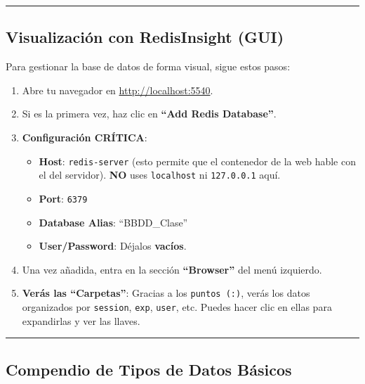 \documentclass[12pt,a4paper]{article}
\providecommand{\tightlist}{%
  \setlength{\itemsep}{0pt}\setlength{\parskip}{0pt}}
\begin{document}
\begin{center}\rule{0.5\linewidth}{0.5pt}\end{center}

\hypertarget{visualizaciuxf3n-con-redisinsight-gui}{%
\subsection{Visualización con RedisInsight
(GUI)}\label{visualizaciuxf3n-con-redisinsight-gui}}

Para gestionar la base de datos de forma visual, sigue estos pasos:

\begin{enumerate}
\def\labelenumi{\arabic{enumi}.}
\tightlist
\item
  Abre tu navegador en \url{http://localhost:5540}.
\item
  Si es la primera vez, haz clic en \textbf{``Add Redis Database''}.
\item
  \textbf{Configuración CRÍTICA}:

  \begin{itemize}
  \tightlist
  \item
    \textbf{Host}: \texttt{redis-server} (esto permite que el
    contenedor de la web hable con el del servidor). \textbf{NO} uses
    \texttt{localhost} ni
    \texttt{127.0.0.1} aquí.
  \item
    \textbf{Port}: \texttt{6379}
  \item
    \textbf{Database Alias}: ``BBDD\_Clase''
  \item
    \textbf{User/Password}: Déjalos \textbf{vacíos}.
  \end{itemize}
\item
  Una vez añadida, entra en la sección \textbf{``Browser''} del menú
  izquierdo.
\item
  \textbf{Verás las ``Carpetas''}: Gracias a los
  \texttt{puntos (:)}, verás los datos organizados por
  \texttt{session}, \texttt{exp},
  \texttt{user}, etc. Puedes hacer clic en ellas para
  expandirlas y ver las llaves.
\end{enumerate}

\begin{center}\rule{0.5\linewidth}{0.5pt}\end{center}

\hypertarget{compendio-de-tipos-de-datos-buxe1sicos}{%
\subsection{Compendio de Tipos de Datos
Básicos}\label{compendio-de-tipos-de-datos-buxe1sicos}}
\end{document}
